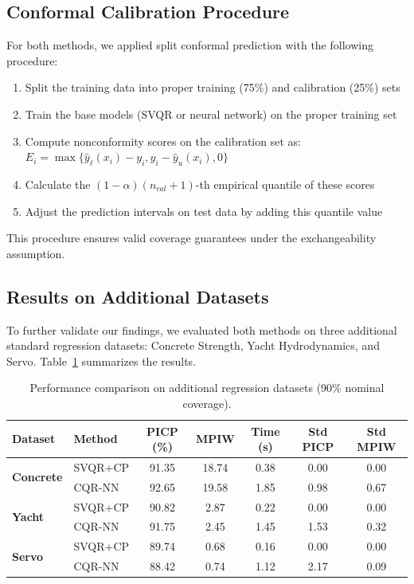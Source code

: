 \documentclass{article}
\begin{document}
\subsection{Conformal Calibration Procedure}
For both methods, we applied split conformal prediction with the following procedure:
\begin{enumerate}
    \item Split the training data into proper training (75\%) and calibration (25\%) sets
    \item Train the base models (SVQR or neural network) on the proper training set
    \item Compute nonconformity scores on the calibration set as:\\
          $E_i = \max\{\hat{y}_{\ell}(x_i) - y_i, y_i - \hat{y}_{u}(x_i), 0\}$
    \item Calculate the $(1-\alpha)(n_{cal}+1)$-th empirical quantile of these scores
    \item Adjust the prediction intervals on test data by adding this quantile value
\end{enumerate}

This procedure ensures valid coverage guarantees under the exchangeability assumption.

\subsection{Results on Additional Datasets}

To further validate our findings, we evaluated both methods on three additional standard regression datasets: Concrete Strength, Yacht Hydrodynamics, and Servo. Table~\ref{tab:additional_datasets} summarizes the results.

\begin{table}[ht]
  \centering
  \caption{Performance comparison on additional regression datasets (90\% nominal coverage).}
  \label{tab:additional_datasets}
  \begin{tabular}{llccccc}
    \toprule
    Dataset & Method & PICP (\%) & MPIW & Time (s) & Std PICP & Std MPIW \\
    \midrule
    \multirow{2}{*}{\textbf{Concrete}} & SVQR+CP & 91.35 & 18.74 & 0.38 & 0.00 & 0.00 \\
     & CQR-NN & 92.65 & 19.58 & 1.85 & 0.98 & 0.67 \\
    \midrule
    \multirow{2}{*}{\textbf{Yacht}} & SVQR+CP & 90.82 & 2.87 & 0.22 & 0.00 & 0.00 \\
     & CQR-NN & 91.75 & 2.45 & 1.45 & 1.53 & 0.32 \\
    \midrule
    \multirow{2}{*}{\textbf{Servo}} & SVQR+CP & 89.74 & 0.68 & 0.16 & 0.00 & 0.00 \\
     & CQR-NN & 88.42 & 0.74 & 1.12 & 2.17 & 0.09 \\
    \bottomrule
  \end{tabular}
\end{table}
\end{document}
